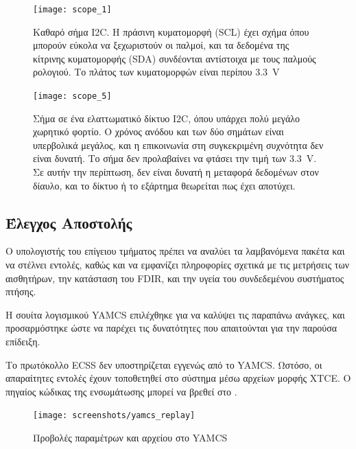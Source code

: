 \documentclass[a4paper,nobib]{tufte-book}
\begin{document}
\begin{figure}[h]
	\texttt{[image: scope\_1]}
	\caption[Καθαρό σήμα \acs{I2C}]{Καθαρό σήμα \acs{I2C}. Η πράσινη κυματομορφή (\acf{SCL}) έχει σχήμα όπου μπορούν εύκολα να ξεχωριστούν οι παλμοί, και τα δεδομένα της κίτρινης κυματομορφής (\acf{SDA}) συνδέονται αντίστοιχα με τους παλμούς ρολογιού. Το πλάτος των κυματομορφών είναι περίπου \SI{3.3}{\volt}}
	\label{subfig:i2c_clean}
\end{figure}

\begin{figure}[h]
	\texttt{[image: scope\_5]}
	\caption[Σήμα σε ένα ελαττωματικό δίκτυο \acs{I2C}]{Σήμα σε ένα ελαττωματικό δίκτυο \acs{I2C}, όπου υπάρχει πολύ μεγάλο χωρητικό φορτίο. Ο χρόνος ανόδου και των δύο σημάτων είναι υπερβολικά μεγάλος, και η επικοινωνία στη συγκεκριμένη συχνότητα δεν είναι δυνατή. Το σήμα δεν προλαβαίνει να φτάσει την τιμή των \SI{3.3}{\volt}. Σε αυτήν την περίπτωση, δεν είναι δυνατή η μεταφορά δεδομένων στον δίαυλο, και το δίκτυο ή το εξάρτημα θεωρείται πως έχει αποτύχει.}
	\label{subfig:i2c_dirty}
\end{figure}

\FloatBarrier

\subsection{Έλεγχος Αποστολής}

Ο υπολογιστής του επίγειου τμήματος πρέπει να αναλύει τα λαμβανόμενα πακέτα και να στέλνει εντολές, καθώς και να εμφανίζει πληροφορίες σχετικά με τις μετρήσεις των αισθητήρων, την κατάσταση του \ac{FDIR}, και την υγεία του συνδεδεμένου συστήματος πτήσης.

Η σουίτα λογισμικού \acs{YAMCS} \autocite{sela_yamcs_lightweight_2012} επιλέχθηκε για να καλύψει τις παραπάνω ανάγκες, και προσαρμόστηκε ώστε να παρέχει τις δυνατότητες που απαιτούνται για την παρούσα επίδειξη.

Το πρωτόκολλο \ac{ECSS} \autocite{ECSS-E-ST-70-41C} δεν υποστηρίζεται εγγενώς από το \acs{YAMCS}. Ωστόσο, οι απαραίτητες εντολές έχουν τοποθετηθεί στο σύστημα μέσω αρχείων μορφής \ac{XTCE}.\autocite{simon_xtce_standard_2004} Ο πηγαίος κώδικας της ενσωμάτωσης μπορεί να βρεθεί στο .

\begin{figure}[h]
	\texttt{[image: screenshots/yamcs\_replay]}
	\caption{Προβολές παραμέτρων και αρχείου στο \acs{YAMCS}}
\end{figure}
\end{document}
